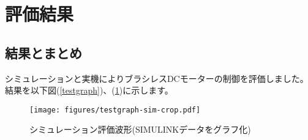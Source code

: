 %
%
%
\section{評価結果}
\subsection{結果とまとめ}
シミュレーションと実機によりブラシレスDCモーターの制御を評価しました。結果を以下図(\ref{testgraph})、(\ref{testgraph-sim})に示します。
\begin{figure}[htbp!]
 \begin{minipage}{1.0\hsize}
  \begin{center}
   \texttt{[image: figures/testgraph-sim-crop.pdf]}
  \end{center}
  \caption{シミュレーション評価波形(SIMULINKデータをグラフ化)}
  \label{testgraph-sim}
 \end{minipage}
\end{figure}

